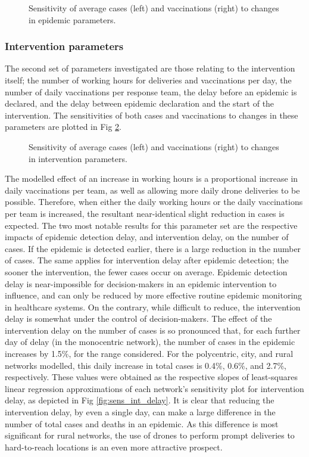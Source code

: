 \documentclass[10pt,letterpaper]{article}
\begin{document}
\begin{figure}[ht!]
    \caption{Sensitivity of average cases (left) and vaccinations (right) to changes in epidemic parameters.}
  \label{fig:sens_epi}
\end{figure}

\subsubsection*{Intervention parameters}
The second set of parameters investigated are those relating to the intervention itself; the number of working hours for deliveries and vaccinations per day, the number of daily vaccinations per response team, the delay before an epidemic is declared, and the delay between epidemic declaration and the start of the intervention. The sensitivities of both cases and vaccinations to changes in these parameters are plotted in Fig \ref{fig:sens_int}.

\begin{figure}[ht!]
    \caption{Sensitivity of average cases (left) and vaccinations (right) to changes in intervention parameters.}
  \label{fig:sens_int}
\end{figure}

The modelled effect of an increase in working hours is a proportional increase in daily vaccinations per team, as well as allowing more daily drone deliveries to be possible. Therefore, when either the daily working hours or the daily vaccinations per team is increased, the resultant near-identical slight reduction in cases is expected. 
The two most notable results for this parameter set are the respective impacts of epidemic detection delay, and intervention delay, on the number of cases. If the epidemic is detected earlier, there is a large reduction in the number of cases. The same applies for intervention delay after epidemic detection; the sooner the intervention, the fewer cases occur on average. 
Epidemic detection delay is near-impossible for decision-makers in an epidemic intervention to influence, and can only be reduced by more effective routine epidemic monitoring in healthcare systems. On the contrary, while difficult to reduce, the intervention delay is somewhat under the control of decision-makers. The effect of the intervention delay on the number of cases is so pronounced that, for each further day of delay (in the monocentric network), the number of cases in the epidemic increases by 1.5\%, for the range considered. For the polycentric, city, and rural networks modelled, this daily increase in total cases is 0.4\%, 0.6\%, and 2.7\%, respectively. These values were obtained as the respective slopes of least-squares linear regression approximations of each network's sensitivity plot for intervention delay, as depicted in Fig \ref{fig:sens_int_delay}. It is clear that reducing the intervention delay, by even a single day, can make a large difference in the number of total cases and deaths in an epidemic. As this difference is most significant for rural networks, the use of drones to perform prompt deliveries to hard-to-reach locations is an even more attractive prospect.
\end{document}
